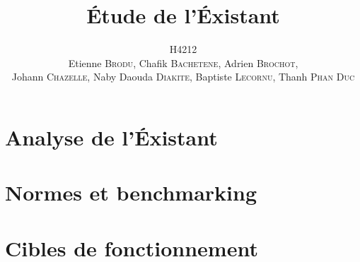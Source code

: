 \documentclass[a4paper,11pt]{article}
\title{\'Etude de l'\'Existant}
\author{H4212\\Etienne \textsc{Brodu}, Chafik \textsc{Bachetene}, Adrien \textsc{Brochot},\\Johann \textsc{Chazelle}, Naby Daouda \textsc{Diakite}, Baptiste \textsc{Lecornu}, Thanh \textsc{Phan Duc}}
\begin{document}
\maketitle
\newpage

\tableofcontents
\newpage

\part{Analyse de l'\'Existant}
    

\part{Normes et benchmarking}
    

\part{Cibles de fonctionnement}
    
\end{document}
